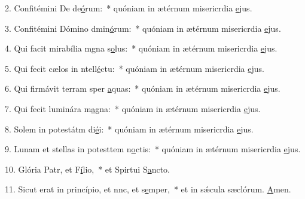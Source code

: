 2. Confitémini De de\uline{ó}rum:~* quóniam in ætérnum misericrdia \uline{e}jus.\par 
3. Confitémini Dómino dmin\uline{ó}rum:~* quóniam in ætérnum misericrdia \uline{e}jus.\par 
4. Qui facit mirabília mgna s\uline{o}lus:~* quóniam in ætérnum misericrdia \uline{e}jus.\par 
5. Qui fecit cælos in ntell\uline{é}ctu:~* quóniam in ætérnum misericrdia \uline{e}jus.\par 
6. Qui firmávit terram sper \uline{a}quas:~* quóniam in ætérnum misericrdia \uline{e}jus.\par 
7. Qui fecit luminára m\uline{a}gna:~* quóniam in ætérnum misericrdia \uline{e}jus.\par 
8. Solem in potestátm di\uline{é}i:~* quóniam in ætérnum misericrdia \uline{e}jus.\par 
9. Lunam et stellas in potesttem n\uline{o}ctis:~* quóniam in ætérnum misericrdia \uline{e}jus.\par 
10. Glória Patr, et F\uline{í}lio,~* et Spirtui S\uline{a}ncto.\par 
11. Sicut erat in princípio, et nnc, et s\uline{e}mper,~* et in sǽcula sæclórum. \uline{A}men.\par 
